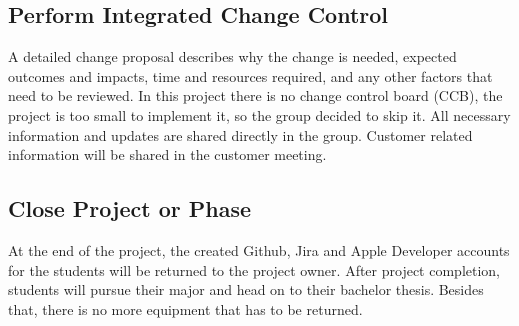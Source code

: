 \subsection{Perform Integrated Change Control}
A detailed change proposal describes why the change is needed, expected outcomes and impacts, time and resources required, and any other factors that need to be reviewed. 
In this project there is no  change control board (CCB), the project is too small to implement it, so the group decided to skip it. All necessary information and updates are shared directly in the group. Customer related information will be shared in the customer meeting.

\subsection{Close Project or Phase}
At the end of the project, the created Github, Jira and Apple Developer accounts for the students will be returned to the project owner. \newline
After project completion, students will pursue their major and head on to their bachelor thesis.\newline
Besides that, there is no more equipment that has to be returned.

